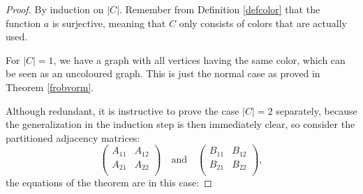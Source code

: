 \documentclass[a4paper,11pt]{report}
\begin{document}
\begin{proof}
   By induction on $|C|$. Remember from Definition \ref{defcolor} that the function $a$ is surjective, meaning that
  $C$ only consists of colors that are actually used.
    
   For $|C|=1$, we have a graph with all vertices having the same color, which can be seen as an uncoloured graph. This is just 
   the normal case as proved in Theorem \ref{frobvorm}.
      
Although redundant, it is instructive to prove the case $|C|=2$ separately, because the 
generalization in the induction step is then immediately clear, so consider 
the partitioned adjacency matrices:
$$\begin{pmatrix}
A_{11} & A_{12}\\
A_{21} & A_{22}\\
\end{pmatrix} \quad \text{and} \quad
\begin{pmatrix}
B_{11} & B_{12}\\
B_{21} & B_{22}\\
\end{pmatrix},$$
the equations of the theorem are in this case:


\end{proof}
\end{document}

